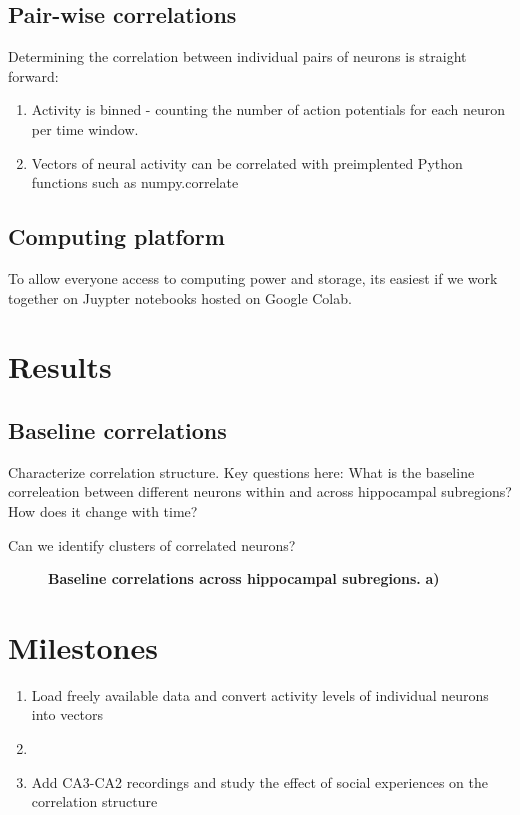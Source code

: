 \documentclass[a4paper]{article}
\begin{document}
\subsection{Pair-wise correlations}
Determining the correlation between individual pairs of neurons is straight forward: 
\begin{enumerate}
    \item Activity is binned - counting the number of action potentials for each neuron per time window.
    \item Vectors of neural activity can be correlated with preimplented Python functions such as numpy.correlate
\end{enumerate} 

\subsection{Computing platform}
To allow everyone access to computing power and storage, its easiest if we work together on Juypter notebooks hosted on Google Colab.

\section{Results}
\subsection{Baseline correlations}
Characterize correlation structure. Key questions here: What is the baseline correleation between different neurons within and across hippocampal subregions? How does it change with time?

Can we identify clusters of correlated neurons? 

\begin{figure}[H]
 \centering
  \begin{subfigure}[b]{0.29\textwidth}
     \centering
     
     \caption{}
     \label{fig:SeqComp_ActivationFunction}
 \end{subfigure}
 \hfill     
    \caption{
    \textbf{Baseline correlations across hippocampal subregions.}
    \textbf{a)}
}
    \label{fig:SeqComp_SingleSequence}
\end{figure}


\section{Milestones}
\begin{enumerate}
    \item Load freely available data and convert activity levels of individual neurons into vectors
    \item 
    \item Add CA3-CA2 recordings and study the effect of social experiences on the correlation structure
\end{enumerate}


\end{document}
